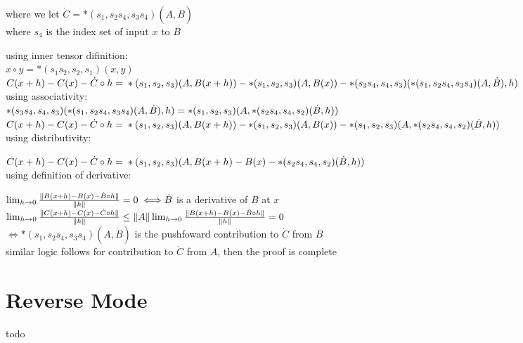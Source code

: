 \documentclass[8pt]{extarticle}
\begin{document}
\begin{multicols*}{2}
  where we let $\dot{C}= *(s_1, s_2 s_4, s_3 s_4)(A,\dot{B})$\\
  where $s_4$ is the index set of input $x$ to $B$

  using inner tensor difinition:\\
  $x \circ y = *(s_1 s_2, s_2, s_1)(x,y)$\\

  $C(x+h) - C(x) - \dot{C} \circ h =\\
  *(s_1, s_2, s_3)(A, B(x+h))\\
  - *(s_1, s_2, s_3)(A, B(x))\\
  - *(s_3 s_4, s_4, s_3)(*(s_1, s_2 s_4, s_3 s_4)(A, \dot{B}), h)$\\

  using associativity:\\
  $*(s_3 s_4, s_4, s_3)(*(s_1, s_2 s_4, s_3 s_4)(A, \dot{B}), h)\\ = *(s_1, s_2, s_3)(A, *(s_2 s_4, s_4, s_2)(\dot{B}, h))$\\

  $C(x+h) - C(x) - \dot{C} \circ h =\\
  *(s_1, s_2, s_3)(A, B(x+h))\\
  - *(s_1, s_2, s_3)(A, B(x))\\
  - *(s_1, s_2, s_3)(A, *(s_2 s_4, s_4, s_2)(\dot{B}, h))$\\

  using distributivity:

  $C(x+h) - C(x) - \dot{C} \circ h =\\
  *(s_1, s_2, s_3)(A, B(x+h) - B(x) - *(s_2 s_4, s_4, s_2)(\dot{B}, h))$\\

  using definition of derivative:

  $\lim_{h \rightarrow 0} \frac{\| B(x+h) - B(x) - \dot{B} \circ h \|}{\|h\|} = 0 \iff \\ \dot{B}$ is a derivative of $B$ at $x$\\

  $\lim_{h \rightarrow 0} \frac{\| C(x+h) - C(x) - \dot{C} \circ h \|}{\|h\|} \\ \leq \|A\| \lim_{h \rightarrow 0} \frac{\| B(x+h) - B(x) - \dot{B} \circ h \|}{\|h\|} = 0$\\
  $\iff *(s_1, s_2 s_4, s_3 s_4)(A, \dot{B})$ is the pushfoward contribution to $\dot{C}$ from $B$\\

  similar logic follows for contribution to $\dot{C}$ from $A$, then the proof is complete
  
  \vfill\null
  \columnbreak
    
  \section{Reverse Mode}
  todo
  
\end{multicols*}
\end{document}
